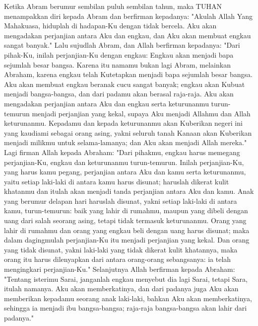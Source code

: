 \begin{biblechapter} %
 Ketika Abram berumur sembilan puluh sembilan tahun, maka TUHAN menampakkan diri kepada Abram dan berfirman kepadanya: "Akulah Allah Yang Mahakuasa, hiduplah di hadapan-Ku dengan tidak bercela.
\verse Aku akan mengadakan perjanjian antara Aku dan engkau, dan Aku akan membuat engkau sangat banyak."
\verse Lalu sujudlah Abram, dan Allah berfirman kepadanya:
\verse "Dari pihak-Ku, inilah perjanjian-Ku dengan engkau: Engkau akan menjadi bapa sejumlah besar bangsa.
\verse Karena itu namamu bukan lagi Abram, melainkan Abraham, karena engkau telah Kutetapkan menjadi bapa sejumlah besar bangsa.
\verse Aku akan membuat engkau beranak cucu sangat banyak; engkau akan Kubuat menjadi bangsa-bangsa, dan dari padamu akan berasal raja-raja.
\verse Aku akan mengadakan perjanjian antara Aku dan engkau serta keturunanmu turun-temurun menjadi perjanjian yang kekal, supaya Aku menjadi Allahmu dan Allah keturunanmu.
\verse Kepadamu dan kepada keturunanmu akan Kuberikan negeri ini yang kaudiami sebagai orang asing, yakni seluruh tanah Kanaan akan Kuberikan menjadi milikmu untuk selama-lamanya; dan Aku akan menjadi Allah mereka."
\verse Lagi firman Allah kepada Abraham: "Dari pihakmu, engkau harus memegang perjanjian-Ku, engkau dan keturunanmu turun-temurun.
\verse Inilah perjanjian-Ku, yang harus kamu pegang, perjanjian antara Aku dan kamu serta keturunanmu, yaitu setiap laki-laki di antara kamu harus disunat;
\verse haruslah dikerat kulit khatanmu dan itulah akan menjadi tanda perjanjian antara Aku dan kamu.
\verse Anak yang berumur delapan hari haruslah disunat, yakni setiap laki-laki di antara kamu, turun-temurun: baik yang lahir di rumahmu, maupun yang dibeli dengan uang dari salah seorang asing, tetapi tidak termasuk keturunanmu.
\verse Orang yang lahir di rumahmu dan orang yang engkau beli dengan uang harus disunat; maka dalam dagingmulah perjanjian-Ku itu menjadi perjanjian yang kekal.
\verse Dan orang yang tidak disunat, yakni laki-laki yang tidak dikerat kulit khatannya, maka orang itu harus dilenyapkan dari antara orang-orang sebangsanya: ia telah mengingkari perjanjian-Ku."
\verse Selanjutnya Allah berfirman kepada Abraham: "Tentang isterimu Sarai, janganlah engkau menyebut dia lagi Sarai, tetapi Sara, itulah namanya.
\verse Aku akan memberkatinya, dan dari padanya juga Aku akan memberikan kepadamu seorang anak laki-laki, bahkan Aku akan memberkatinya, sehingga ia menjadi ibu bangsa-bangsa; raja-raja bangsa-bangsa akan lahir dari padanya."

\end{biblechapter}
